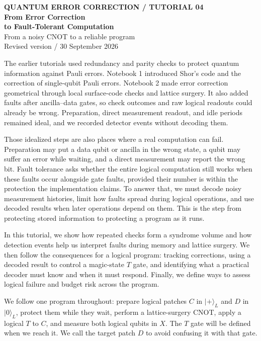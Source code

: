 \documentclass[11pt,a4paper]{article}
\newcommand{\ket}[1]{\lvert #1\rangle}
\begin{document}
\begin{center}
{\small\color{teal}\textbf{QUANTUM ERROR CORRECTION / TUTORIAL 04}}\\[9pt]
{\LARGE\bfseries\color{ink} From Error Correction\\[3pt] to Fault-Tolerant Computation}\\[9pt]
{\large From a noisy CNOT to a reliable program}\\[6pt]
{\small Revised version / 30 September 2026}
\end{center}

The earlier tutorials used redundancy and parity checks to protect quantum information against Pauli errors. Notebook 1 introduced Shor's code and the correction of single-qubit Pauli errors. Notebook 2 made error correction geometrical through local surface-code checks and lattice surgery. It also added faults after ancilla--data gates, so check outcomes and raw logical readouts could already be wrong. Preparation, direct measurement readout, and idle periods remained ideal, and we recorded detector events without decoding them.

Those idealized steps are also places where a real computation can fail. Preparation may put a data qubit or ancilla in the wrong state, a qubit may suffer an error while waiting, and a direct measurement may report the wrong bit. Fault tolerance asks whether the entire logical computation still works when these faults occur alongside gate faults, provided their number is within the protection the implementation claims. To answer that, we must decode noisy measurement histories, limit how faults spread during logical operations, and use decoded results when later operations depend on them. This is the step from protecting stored information to protecting a program as it runs.

In this tutorial, we show how repeated checks form a syndrome volume and how detection events help us interpret faults during memory and lattice surgery. We then follow the consequences for a logical program: tracking corrections, using a decoded result to control a magic-state \(T\) gate, and identifying what a practical decoder must know and when it must respond. Finally, we define ways to assess logical failure and budget risk across the program. 

We follow one program throughout: prepare logical patches $C$ in $\ket+_L$ and $D$ in $\ket0_L$, protect them while they wait, perform a lattice-surgery CNOT, apply a logical $T$ to $C$, and measure both logical qubits in $X$. The $T$ gate will be defined when we reach it. We call the target patch $D$ to avoid confusing it with that gate.
\end{document}
